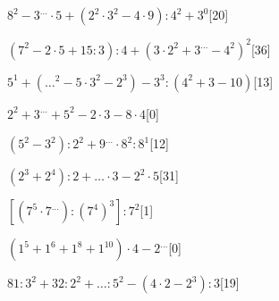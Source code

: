 \begin{esercizio} \label{ese:1.17}
$8^2-3^{\dots}\cdot5+(2^2\cdot3^2-4\cdot9):4^2+3^0$\hfill[20]
\end{esercizio}
\begin{esercizio} \label{ese:1.17}
$(7^2-2\cdot5+15:3):4+(3\cdot2^2+3^{\dots}-4^2)^2$\hfill[36]
\end{esercizio}
\begin{esercizio} \label{ese:1.17}
$5^1+({\dots}^2-5\cdot3^2-2^3)-3^3:(4^2+3-10)$\hfill[13]
\end{esercizio}
\begin{esercizio} \label{ese:1.17}
$2^2+3^{\dots}+5^2-2\cdot3-8\cdot4$\hfill[0]
\end{esercizio}
\begin{esercizio} \label{ese:1.17}
$(5^2-3^2):2^2+9^{\dots}\cdot8^2:8^1$\hfill[12]
\end{esercizio}
\begin{esercizio} \label{ese:1.17}
$(2^3+2^4):2+{\dots}\cdot3-2^2\cdot5$\hfill[31]
\end{esercizio}
\begin{esercizio} \label{ese:1.17}
$[(7^5\cdot7^{\dots}):(7^4)^3]:7^2$\hfill[1]
\end{esercizio}
\begin{esercizio} \label{ese:1.17}
$(1^5+1^6+1^8+1^{10})\cdot4-2^{\dots}$\hfill[0]
\end{esercizio}
\begin{esercizio} \label{ese:1.17}
$81:3^2+32:2^2+{\dots}:5^2-(4\cdot2-2^3):3$\hfill[19]
\end{esercizio}
